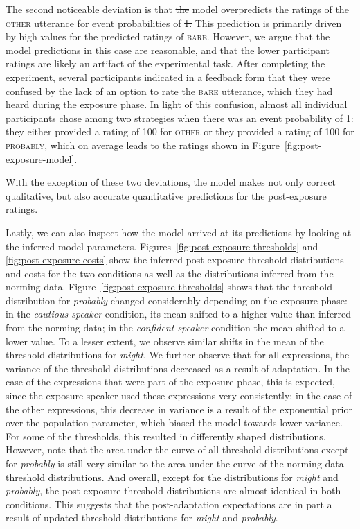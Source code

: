 \documentclass[man, floatsintext]{apa6}
\newcommand{\figref}[1]{Figure~\ref{#1}}
\providecommand{\DIFadd}[1]{{\protect\color{blue}\uwave{#1}}} %
\providecommand{\DIFdel}[1]{{\protect\color{red}\sout{#1}}}                      %
\providecommand{\DIFaddbegin}{} %
\providecommand{\DIFaddend}{} %
\providecommand{\DIFdelbegin}{} %
\providecommand{\DIFdelend}{} %
\newcommand{\DIFscaledelfig}{0.5}
\newlength{\DIFdelgraphicswidth} %
\newlength{\DIFdelgraphicsheight} %
\newcommand{\DIFaddincludegraphics}[2][]{{\color{blue}\fbox{\DIFOincludegraphics[#1]{#2}}}} %
\newcommand{\DIFdelincludegraphics}[2][]{%
\sbox{\DIFdelgraphicsbox}{\DIFOincludegraphics[#1]{#2}}%
\settoboxwidth{\DIFdelgraphicswidth}{\DIFdelgraphicsbox} %
\settoboxtotalheight{\DIFdelgraphicsheight}{\DIFdelgraphicsbox} %
\scalebox{\DIFscaledelfig}{%
\parbox[b]{\DIFdelgraphicswidth}{\usebox{\DIFdelgraphicsbox}\\[-\baselineskip] \rule{\DIFdelgraphicswidth}{0em}}\llap{\resizebox{\DIFdelgraphicswidth}{\DIFdelgraphicsheight}{%
\setlength{\unitlength}{\DIFdelgraphicswidth}%
\begin{picture}(1,1)%
\thicklines\linethickness{2pt} %
{\color[rgb]{1,0,0}\put(0,0){\framebox(1,1){}}}%
{\color[rgb]{1,0,0}\put(0,0){\line( 1,1){1}}}%
{\color[rgb]{1,0,0}\put(0,1){\line(1,-1){1}}}%
\end{picture}%
}\hspace*{3pt}}} %
} %
\DeclareRobustCommand{\DIFaddbegin}{\DIFOaddbegin \let\includegraphics\DIFaddincludegraphics} %
\DeclareRobustCommand{\DIFaddend}{\DIFOaddend \let\includegraphics\DIFOincludegraphics} %
\DeclareRobustCommand{\DIFdelbegin}{\DIFOdelbegin \let\includegraphics\DIFdelincludegraphics} %
\DeclareRobustCommand{\DIFdelend}{\DIFOaddend \let\includegraphics\DIFOincludegraphics} %
\begin{document}
The second noticeable deviation is that \DIFdelbegin \DIFdel{the }\DIFdelend \DIFaddbegin \DIFadd{in the }\textit{\DIFadd{confident speaker}} \DIFadd{condition, the }\DIFaddend model overpredicts the ratings of the \textsc{other} utterance for event probabilities of \DIFdelbegin \DIFdel{1. }\DIFdelend \DIFaddbegin \DIFadd{1 . }\DIFaddend This prediction is primarily driven by high values for the predicted ratings of \textsc{bare}. However, we argue that the model predictions in this case are reasonable, and that the lower participant ratings are likely an artifact of the experimental task. After completing the experiment, 
several participants indicated in a feedback form that they were confused by the lack of an option to rate the \textsc{bare} utterance, 
which they had heard during the exposure phase. In light of this confusion, almost all individual participants chose among two strategies when there was an event probability of 1: they either provided a rating of 100 for \textsc{other} 
or they provided a rating of 100 for \textsc{probably}, which on average leads to the ratings shown in \figref{fig:post-exposure-model}.

With the exception of these two deviations, the model makes not only correct qualitative, but also accurate quantitative predictions for the post-exposure ratings.

Lastly, we can also inspect how the model arrived at its predictions by looking at the inferred model parameters.  
Figures~\ref{fig:post-exposure-thresholds} and \ref{fig:post-exposure-costs} show the inferred
post-exposure threshold distributions and costs for the two conditions as well as the distributions inferred from the norming data.
Figure~\ref{fig:post-exposure-thresholds} shows that the threshold distribution for \textit{probably}
changed considerably depending on the exposure phase: in the \textit{cautious speaker} condition,
its mean shifted to a higher value than  inferred from the norming data; in the \textit{confident speaker} condition the mean 
shifted to a lower value. To a lesser extent, we observe similar shifts in the mean of the threshold
distributions for \textit{might}. We further observe that for all expressions, the variance of the threshold
distributions decreased as a result of adaptation. In the case of the expressions that were part of the exposure
phase, this is expected, since the exposure speaker used these expressions very consistently; in the case of the
other expressions, this decrease in variance is a result of the exponential prior over the population parameter,
which biased the model towards lower variance. For some of the thresholds, this resulted in differently shaped distributions.
However, note that the area under the curve of all threshold distributions except for \textit{probably} is still very similar to the 
area under the curve of the norming data threshold distributions. And overall, except for the distributions
for \textit{might} and \textit{probably}, the post-exposure threshold distributions are almost identical in both conditions.
This suggests that the post-adaptation expectations 
are in part a result of updated threshold distributions for \textit{might} and \textit{probably}.
\end{document}
